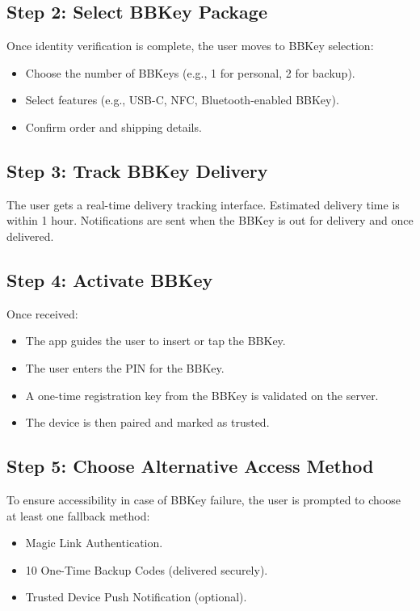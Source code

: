 \documentclass[12pt]{article}
\begin{document}
\subsection*{Step 2: Select BBKey Package}
Once identity verification is complete, the user moves to BBKey selection:
\begin{itemize}
    \item Choose the number of BBKeys (e.g., 1 for personal, 2 for backup).
    \item Select features (e.g., USB-C, NFC, Bluetooth-enabled BBKey).
    \item Confirm order and shipping details.
\end{itemize}

\subsection*{Step 3: Track BBKey Delivery}
The user gets a real-time delivery tracking interface. Estimated delivery time is within 1 hour. Notifications are sent when the BBKey is out for delivery and once delivered.

\subsection*{Step 4: Activate BBKey}
Once received:
\begin{itemize}
    \item The app guides the user to insert or tap the BBKey.
    \item The user enters the PIN for the BBKey.
    \item A one-time registration key from the BBKey is validated on the server.
    \item The device is then paired and marked as trusted.
\end{itemize}

\subsection*{Step 5: Choose Alternative Access Method}
To ensure accessibility in case of BBKey failure, the user is prompted to choose at least one fallback method:
\begin{itemize}
    \item Magic Link Authentication.
    \item 10 One-Time Backup Codes (delivered securely).
    \item Trusted Device Push Notification (optional).
\end{itemize}
\end{document}
